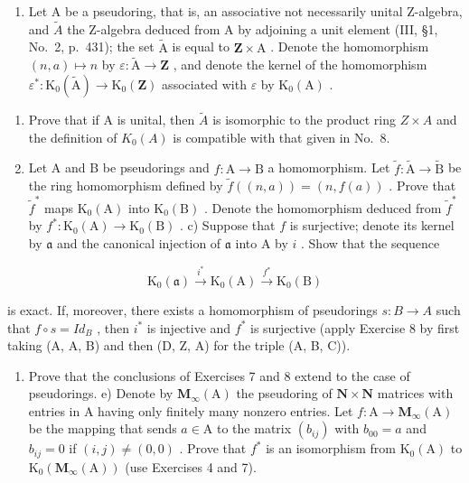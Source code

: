 \begin{enumerate}
\def\labelenumi{\arabic{enumi})}
\setcounter{enumi}{8}
\tightlist
\item
  Let A be a pseudoring, that is, an associative not necessarily unital Z-algebra, and \(\widetilde{A}\) the Z-algebra deduced from A by adjoining a unit element (III, §1, No.~2, p.~431); the set \(\widetilde{\mathrm{A}}\) is equal to \(\mathbf{Z} \times \mathrm{A}\) . Denote the homomorphism \((n, a) \mapsto n\) by \(\varepsilon : \widetilde{\mathrm{A}} \to \mathbf{Z}\) , and denote the kernel of the homomorphism \(\varepsilon^{*} : \mathrm{K}_{0}(\widetilde{\mathrm{A}}) \to \mathrm{K}_{0}(\mathbf{Z})\) associated with \(\varepsilon\) by \(\mathrm{K}_{0}(\mathrm{A})\) .
\end{enumerate}

\begin{enumerate}
\def\labelenumi{\alph{enumi})}
\item
  Prove that if A is unital, then \(\tilde{A}\) is isomorphic to the product ring \(Z \times A\) and the definition of \(K_{0}(A)\) is compatible with that given in No.~8.
\item
  Let A and B be pseudorings and \(f: \mathrm{A} \to \mathrm{B}\) a homomorphism. Let \(\widetilde{f}: \widetilde{\mathrm{A}} \to \widetilde{\mathrm{B}}\) be the ring homomorphism defined by \(\widetilde{f}((n, a)) = (n, f(a))\) . Prove that \(\widetilde{f}^*\) maps \(\mathrm{K}_0(\mathrm{A})\) into \(\mathrm{K}_0(\mathrm{B})\) . Denote the homomorphism deduced from \(\widetilde{f}^*\) by \(f^*: \mathrm{K}_0(\mathrm{A}) \to \mathrm{K}_0(\mathrm{B})\) . c) Suppose that \(f\) is surjective; denote its kernel by \(\mathfrak{a}\) and the canonical injection of \(\mathfrak{a}\) into A by \(i\) . Show that the sequence
\end{enumerate}

\[
\mathrm{K} _ {0} (\mathfrak {a}) \xrightarrow {i ^ {*}} \mathrm{K} _ {0} (\mathrm{A}) \xrightarrow {f ^ {*}} \mathrm{K} _ {0} (\mathrm{B})
\]

is exact. If, moreover, there exists a homomorphism of pseudorings \(s: B \to A\) such that \(f \circ s = Id_{B}\) , then \(i^{*}\) is injective and \(f^{*}\) is surjective (apply Exercise 8 by first taking (A, A, B) and then (D, Z, A) for the triple (A, B, C)).

\begin{enumerate}
\def\labelenumi{\alph{enumi})}
\setcounter{enumi}{3}
\tightlist
\item
  Prove that the conclusions of Exercises 7 and 8 extend to the case of pseudorings. e) Denote by \(\mathbf{M}_{\infty}(\mathrm{A})\) the pseudoring of \(\mathbf{N} \times \mathbf{N}\) matrices with entries in A having only finitely many nonzero entries. Let \(f: \mathrm{A} \to \mathbf{M}_{\infty}(\mathrm{A})\) be the mapping that sends \(a \in \mathrm{A}\) to the matrix \((b_{ij})\) with \(b_{00} = a\) and \(b_{ij} = 0\) if \((i,j) \neq (0,0)\) . Prove that \(f^{*}\) is an isomorphism from \(\mathrm{K}_0(\mathrm{A})\) to \(\mathrm{K}_0(\mathbf{M}_{\infty}(\mathrm{A}))\) (use Exercises 4 and 7).
\end{enumerate}

